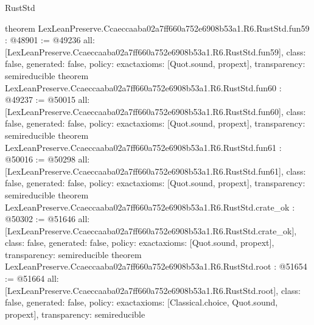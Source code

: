 \begin{lexlean}{RustStd}
\begin{coremodule}
{}
theorem LexLeanPreserve.Ccaeccaaba02a7ff660a752e6908b53a1.R6.RustStd.fun59 : @48901 := @49236 {
  all: [LexLeanPreserve.Ccaeccaaba02a7ff660a752e6908b53a1.R6.RustStd.fun59],
  class: false,
  generated: false,
  policy: exact{axioms: [Quot.sound, propext]},
  transparency: semireducible
}
theorem LexLeanPreserve.Ccaeccaaba02a7ff660a752e6908b53a1.R6.RustStd.fun60 : @49237 := @50015 {
  all: [LexLeanPreserve.Ccaeccaaba02a7ff660a752e6908b53a1.R6.RustStd.fun60],
  class: false,
  generated: false,
  policy: exact{axioms: [Quot.sound, propext]},
  transparency: semireducible
}
theorem LexLeanPreserve.Ccaeccaaba02a7ff660a752e6908b53a1.R6.RustStd.fun61 : @50016 := @50298 {
  all: [LexLeanPreserve.Ccaeccaaba02a7ff660a752e6908b53a1.R6.RustStd.fun61],
  class: false,
  generated: false,
  policy: exact{axioms: [Quot.sound, propext]},
  transparency: semireducible
}
theorem LexLeanPreserve.Ccaeccaaba02a7ff660a752e6908b53a1.R6.RustStd.crate_ok : @50302 := @51646 {
  all: [LexLeanPreserve.Ccaeccaaba02a7ff660a752e6908b53a1.R6.RustStd.crate_ok],
  class: false,
  generated: false,
  policy: exact{axioms: [Quot.sound, propext]},
  transparency: semireducible
}
theorem LexLeanPreserve.Ccaeccaaba02a7ff660a752e6908b53a1.R6.RustStd.root : @51654 := @51664 {
  all: [LexLeanPreserve.Ccaeccaaba02a7ff660a752e6908b53a1.R6.RustStd.root],
  class: false,
  generated: false,
  policy: exact{axioms: [Classical.choice, Quot.sound, propext]},
  transparency: semireducible
}


\end{coremodule}
\end{lexlean}
